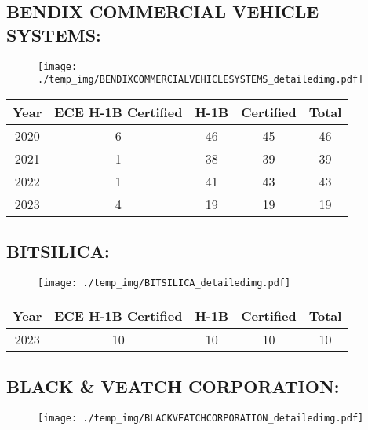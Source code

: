 \documentclass{article}%
\begin{document}
%
\newpage%
\subsection{BENDIX COMMERCIAL VEHICLE SYSTEMS:}%
\label{subsec:BENDIXCOMMERCIALVEHICLESYSTEMS}%
\label{BENDIXCOMMERCIALVEHICLESYSTEMSdetailed}%


\begin{figure}[htbp]%
\centering%
\texttt{[image: ./temp\_img/BENDIXCOMMERCIALVEHICLESYSTEMS\_detailedimg.pdf]}%
\end{figure}

%
\begin{longtable}{c|c|c|c|c}%
\hline%
Year&ECE H{-}1B Certified&H{-}1B&Certified&Total\\%
\hline%
2020&6&46&45&46\\%
\hline%
2021&1&38&39&39\\%
\hline%
2022&1&41&43&43\\%
\hline%
2023&4&19&19&19\\%
\hline%
\end{longtable}

%
\newpage%
\subsection{BITSILICA:}%
\label{subsec:BITSILICA}%
\label{BITSILICAdetailed}%


\begin{figure}[htbp]%
\centering%
\texttt{[image: ./temp\_img/BITSILICA\_detailedimg.pdf]}%
\end{figure}

%
\begin{longtable}{c|c|c|c|c}%
\hline%
Year&ECE H{-}1B Certified&H{-}1B&Certified&Total\\%
\hline%
2023&10&10&10&10\\%
\hline%
\end{longtable}

%
\newpage%
\subsection{BLACK \& VEATCH CORPORATION:}%
\label{subsec:BLACKVEATCHCORPORATION}%
\label{BLACKVEATCHCORPORATIONdetailed}%


\begin{figure}[htbp]%
\centering%
\texttt{[image: ./temp\_img/BLACKVEATCHCORPORATION\_detailedimg.pdf]}%
\end{figure}
\end{document}
